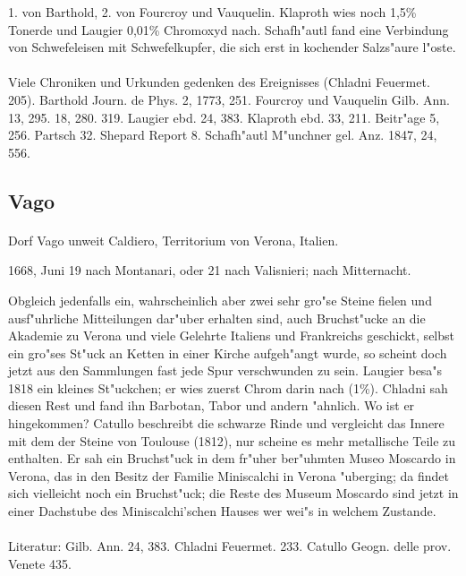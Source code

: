 \documentclass[a4paper, 11pt, oneside]{article}
\begin{document}
1. von Barthold, 2. von Fourcroy und Vauquelin. Klaproth wies noch 1,5\% Tonerde und Laugier 0,01\% Chromoxyd nach. Schafh"autl fand eine Verbindung von Schwefeleisen mit Schwefelkupfer, die sich erst in kochender Salzs"aure l"oste.
\footnotesize
\paragraph{}
Viele Chroniken und Urkunden gedenken des Ereignisses (Chladni Feuermet. 205). Barthold Journ. de Phys. 2, 1773, 251. Fourcroy und Vauquelin Gilb. Ann. 13, 295. 18, 280. 319. Laugier ebd. 24, 383. Klaproth ebd. 33, 211. Beitr"age 5, 256. Partsch 32. Shepard Report 8. Schafh"autl M"unchner gel. Anz. 1847, 24, 556.
\subsection{Vago}
\normalsize
\paragraph{}
Dorf Vago unweit Caldiero, Territorium von Verona, Italien.

1668, Juni 19 nach Montanari, oder 21 nach Valisnieri; nach Mitternacht.

Obgleich jedenfalls ein, wahrscheinlich aber zwei sehr gro"se Steine fielen und ausf"uhrliche Mitteilungen dar"uber erhalten sind, auch Bruchst"ucke an die Akademie zu Verona und viele Gelehrte Italiens und Frankreichs geschickt, selbst ein gro"ses St"uck an Ketten in einer Kirche aufgeh"angt wurde, so scheint doch jetzt aus den Sammlungen fast jede Spur verschwunden zu sein. Laugier besa"s 1818 ein kleines St"uckchen; er wies zuerst Chrom darin nach (1\%). Chladni sah diesen Rest und fand ihn Barbotan, Tabor und andern "ahnlich. Wo ist er hingekommen? Catullo beschreibt die schwarze Rinde und vergleicht das Innere mit dem der Steine von Toulouse (1812), nur scheine es mehr metallische Teile zu enthalten. Er sah ein Bruchst"uck in dem fr"uher ber"uhmten Museo Moscardo in Verona, das in den Besitz der Familie Miniscalchi in Verona "uberging; da findet sich vielleicht noch ein Bruchst"uck; die Reste des Museum Moscardo sind jetzt in einer Dachstube des Miniscalchi'schen Hauses wer wei"s in welchem Zustande.
\footnotesize
\paragraph{}
Literatur: Gilb. Ann. 24, 383. Chladni Feuermet. 233. Catullo Geogn. delle prov. Venete 435.
\end{document}
